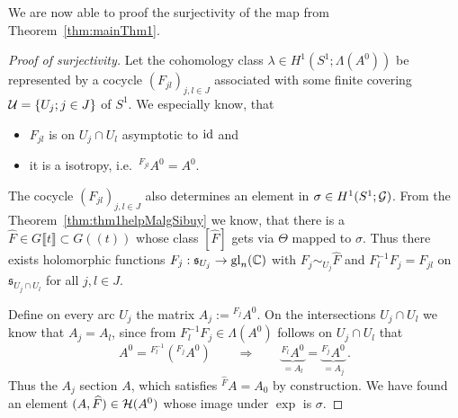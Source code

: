 We are now able to proof the surjectivity of the map from
Theorem~\ref{thm:mainThm1}.
\begin{proof}[Proof of surjectivity]
  Let the cohomology class $\lambda\in H^1(S^1;\Lambda(A^0))$ be represented by
  a cocycle $(F_{jl})_{j,l\in J}$ associated with some finite covering
  $\mathcal{U}=\{U_j;j\in J\}$ of $S^1$. We especially know, that
  \begin{itemize}
    \item $F_{jl}$ is on $U_j\cap U_l$ asymptotic to $\operatorname{id}$ and
    \item it is a isotropy, i.e.\  ${}^{F_{jl}}A^0=A^0$.
  \end{itemize}
  The cocycle $(F_{jl})_{j,l\in J}$ also determines an element in
  $\sigma\in H^1(S^1;\mathcal{G})$.
  From the Theorem~\ref{thm:thm1helpMalgSibuy} we know, that there is a $\hat
  F\in G\llbracket t\rrbracket\subset G(\!(t)\!)$ whose class $[\hat F]$ gets
  via $\Theta$ mapped to $\sigma$.
  Thus there exists holomorphic functions $F_j:\mathfrak{s}_{U_j}\to\operatorname{gl}_n(\mathbb{C})$
  with $F_j\sim_{U_j}\hat F$ and $F_l^{-1}F_j=F_{jl}$ on
  $\mathfrak{s}_{U_j\cap U_l}$ for all $j,l\in J$.

  Define on every arc $U_j$ the matrix $A_j:={}^{F_j}A^0$.
  On the intersections $U_j\cap U_l$ we know that $A_j=A_l$, since
  from $F_l^{-1}F_j\in\Lambda(A^0)$ follows on $U_j\cap U_l$ that
  \[
    A^0={}^{F_l^{-1}}({}^{F_j}A^0)
    \qquad\Longrightarrow{}\qquad
    \underset{=A_l}{\underbrace{{}^{F_l}A^0}}
    =\underset{=A_j}{\underbrace{{}^{F_j}A^0}}
    \,.
  \]
  Thus the $A_j$  section $A$, which satisfies
  ${}^{\hat F}A=A_0$ by construction.
  We have found an element $(A,\widehat F)\in\mathcal{H}(A^0)$ whose image under $\exp$ is
  $\sigma$.
\end{proof}

